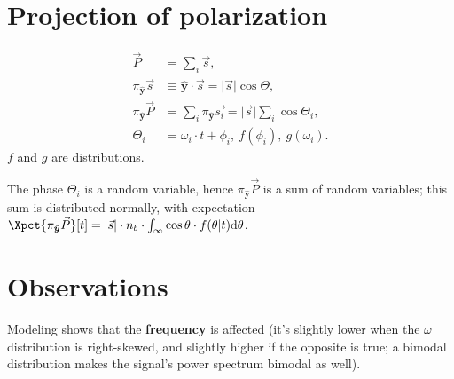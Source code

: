 \documentclass{article}
\newcommand{\uvec}[1]{\boldsymbol{\hat{#1}}}
\newcommand{\abs}[1]{\vert#1\vert}
\newcommand{\proj}[2]{\pi_{\uvec{#2}}\vec{#1}}
\begin{document}
\section{Projection of polarization}
\begin{align*}
	\vec{P} &= \sum_i \vec{s}, \\
	\proj{s}{y} &\equiv \uvec{y}\cdot\vec{s} = \abs{\vec{s}}\cos\Theta, \\
	\proj{P}{y} &= \sum_i \proj{s_i}{y} = \abs{\vec{s}}\sum_i \cos\Theta_i, \\
	\Theta_i &= \omega_i\cdot t + \phi_i,~ f(\phi_i),~g(\omega_i).
\end{align*}
$f$ and $g$ are distributions.

The phase $\Theta_i$ is a random variable, hence $\proj{P}{y}$ is a sum of random variables; this sum is distributed normally, with expectation $\Xpct{\proj{P}{y}}[t] = \abs{\vec{s}}\cdot n_b\cdot \int_\infty\cos\theta\cdot f(\theta|t)\td\theta$.

\section{Observations}
Modeling shows that the \textbf{frequency} is affected (it's slightly lower when the $\omega$ distribution is right-skewed, and slightly higher if the opposite is true; a bimodal distribution makes the signal's power spectrum bimodal as well).
\end{document}
